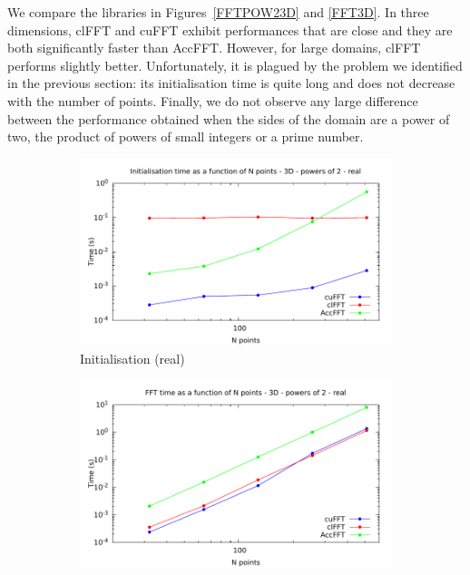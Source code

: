 \documentclass[12pt, a4paper]{article}
\begin{document}
We compare the libraries in Figures~\ref{FFTPOW23D} and \ref{FFT3D}.
In three dimensions, clFFT and cuFFT exhibit performances that are
close and they are both significantly faster than AccFFT. However,
for large domains, clFFT performs slightly better. Unfortunately, it
is plagued by the problem we identified in the previous section: its
initialisation time is quite long and does not decrease with the
number of points. Finally, we do not observe any large difference
between the performance obtained when the sides of the domain are a
power of two, the product of powers of small integers or a prime
number.



\begin{figure}[htb]
\captionsetup{width=0.8\linewidth}
\centering
\begin{subfigure}{.5\textwidth}
\centering
\includegraphics[width=.9\linewidth]{graphs/fft-3d-pow2-r-init.pdf}
\caption{Initialisation (real)}
\label{FFTPOW23DRI}
\end{subfigure}%
\begin{subfigure}{.5\textwidth}
\centering
\includegraphics[width=.9\linewidth]{graphs/fft-3d-pow2-r-exec.pdf}

\end{subfigure}
\end{figure}
\end{document}
